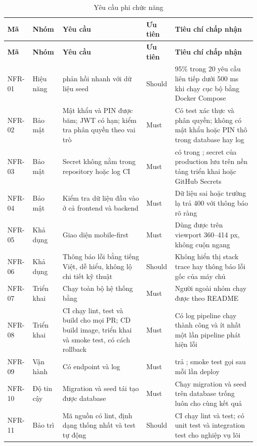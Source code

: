 {\small
\begin{longtable}{@{}L{1.3cm}L{1.6cm}L{4.8cm}L{1.3cm}L{4.9cm}@{}}
\caption{Yêu cầu phi chức năng}\label{tab:nfr}\\
\toprule
\textbf{Mã} & \textbf{Nhóm} & \textbf{Yêu cầu} & \textbf{Ưu tiên} & \textbf{Tiêu chí chấp nhận} \\ \midrule \endfirsthead
\toprule \textbf{Mã} & \textbf{Nhóm} & \textbf{Yêu cầu} & \textbf{Ưu tiên} & \textbf{Tiêu chí chấp nhận} \\ \midrule \endhead
\bottomrule \endfoot
NFR-01 & Hiệu năng &  phản hồi nhanh với dữ liệu seed & Should & 95\% trong 20 yêu cầu liên tiếp dưới 500 ms khi chạy cục bộ bằng Docker Compose \\
NFR-02 & Bảo mật & Mật khẩu và PIN được băm; JWT có hạn; kiểm tra phân quyền theo vai trò & Must & Có test xác thực và phân quyền; không có mật khẩu hoặc PIN thô trong database hay log \\
NFR-03 & Bảo mật & Secret không nằm trong repository hoặc log CI & Must &  có trong ; secret của production lưu trên nền tảng triển khai hoặc GitHub Secrets \\
NFR-04 & Bảo mật & Kiểm tra dữ liệu đầu vào ở cả frontend và backend & Must & Dữ liệu sai hoặc trường lạ trả 400 với thông báo rõ ràng \\
NFR-05 & Khả dụng & Giao diện mobile-first & Must & Dùng được trên viewport 360--414 px, không cuộn ngang \\
NFR-06 & Khả dụng & Thông báo lỗi bằng tiếng Việt, dễ hiểu, không lộ chi tiết kỹ thuật & Should & Không hiển thị stack trace hay thông báo lỗi gốc của máy chủ \\
NFR-07 & Triển khai & Chạy toàn bộ hệ thống bằng  & Must & Người ngoài nhóm chạy được theo README \\
NFR-08 & Triển khai & CI chạy lint, test và build cho mọi PR; CD build image, triển khai và smoke test, có cách rollback & Must & Có log pipeline chạy thành công và ít nhất một lần pipeline phát hiện lỗi \\
NFR-09 & Vận hành & Có endpoint  và log & Must &  trả ; smoke test gọi  sau mỗi lần deploy \\
NFR-10 & Độ tin cậy & Migration và seed tái tạo được database & Must & Chạy migration và seed trên database trống luôn cho cùng kết quả \\
NFR-11 & Bảo trì & Mã nguồn có lint, định dạng thống nhất và test tự động & Should & CI chạy lint và test; có unit test và integration test cho nghiệp vụ lõi \\
\end{longtable}
}